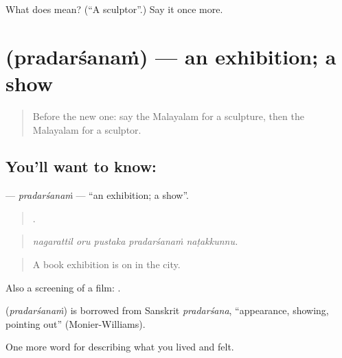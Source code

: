 \begin{tcolorbox}[breakable,colback=teal!4,colframe=teal!35!black,title={Before you move on}]
What does  mean? (\textquotedblleft{}A sculptor\textquotedblright{}.) Say it once more.
\end{tcolorbox}
\section[\texorpdfstring{\ml{പ്രദർശനം} (pradarśanaṁ)}{പ്രദർശനം (pradarśanaṁ)}]{ (pradarśanaṁ) — an exhibition; a show}

\label{lesson:ML-C560-pradarsanam}



\begin{quote}
Before the new one: say the Malayalam for a sculpture, then the Malayalam for a sculptor.
\end{quote}

\subsection*{You'll want to know: }
\textbf{} — \emph{pradarśanaṁ} — \textquotedblleft{}an exhibition; a show\textquotedblright{}.

\begin{quote}
    .
\end{quote}

\begin{quote}
\emph{nagarattil oru pustaka pradarśanaṁ naṭakkunnu.}
\end{quote}

\begin{quote}
A book exhibition is on in the city.
\end{quote}

Also a screening of a film:  .

\begin{cousinweb}
\textbf{} (\emph{pradarśanaṁ}) is borrowed from Sanskrit \emph{pradarśana}, \textquotedblleft{}appearance, showing, pointing out\textquotedblright{} (Monier-Williams).
\end{cousinweb}

\begin{grammarlens}[title={What you've built}]
One more word for describing what you lived and felt.
\end{grammarlens}

